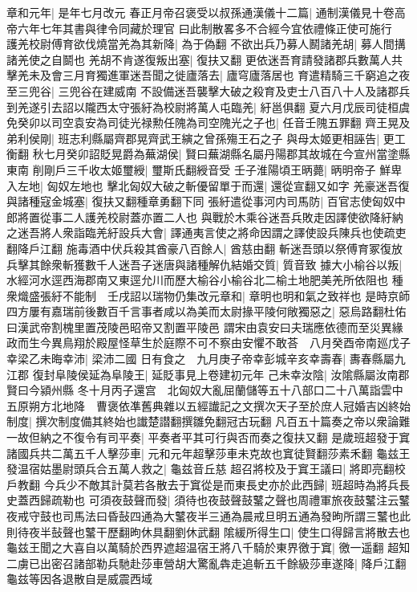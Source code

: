 章和元年|{
	是年七月改元}
春正月帝召褒受以叔孫通漢儀十二篇|{
	通制漢儀見十卷高帝六年七年其書與律令同藏於理官}
曰此制散畧多不合經今宜依禮條正使可施行　護羌校尉傅育欲伐燒當羌為其新降|{
	為于偽翻}
不欲出兵乃募人鬭諸羌胡|{
	募人間搆諸羌使之自鬬也}
羌胡不肯遂復叛出塞|{
	復扶又翻}
更依迷吾育請發諸郡兵數萬人共擊羌未及會三月育獨進軍迷吾聞之徙廬落去|{
	廬穹廬落居也}
育遣精騎三千窮追之夜至三兜谷|{
	三兜谷在建威南}
不設備迷吾襲擊大破之殺育及吏士八百八十人及諸郡兵到羌遂引去詔以隴西太守張紆為校尉將萬人屯臨羌|{
	紆邕俱翻}
夏六月戊辰司徒桓虞免癸卯以司空袁安為司徒光禄勲任隗為司空隗光之子也|{
	任音壬隗五罪翻}
齊王晃及弟利侯剛|{
	班志利縣屬齊郡晃齊武王縯之曾孫殤王石之子}
與母太姬更相誣告|{
	更工衡翻}
秋七月癸卯詔貶晃爵為蕪湖侯|{
	賢曰蕪湖縣名屬丹陽郡其故城在今宣州當塗縣東南}
削剛戶三千收太姬璽綬|{
	璽斯氏翻綬音受}
壬子淮陽頃王昞薨|{
	昞明帝子}
鮮卑入左地|{
	匈奴左地也}
擊北匈奴大破之斬優留單于而還|{
	還從宣翻又如字}
羌豪迷吾復與諸種寇金城塞|{
	復扶又翻種章勇翻下同}
張紆遣從事河内司馬防|{
	百官志使匈奴中郎將置從事二人護羌校尉蓋亦置二人也}
與戰於木乘谷迷吾兵敗走因譯使欲降紆納之迷吾將人衆詣臨羌紆設兵大會|{
	譯通夷言使之將命因謂之譯使設兵陳兵也使疏吏翻降戶江翻}
施毒酒中伏兵殺其酋豪八百餘人|{
	酋慈由翻}
斬迷吾頭以祭傅育冢復放兵擊其餘衆斬獲數千人迷吾子迷唐與諸種解仇結婚交質|{
	質音致}
據大小榆谷以叛|{
	水經河水逕西海郡南又東逕允川而歷大榆谷小榆谷北二榆土地肥美羌所依阻也}
種衆熾盛張紆不能制　壬戌詔以瑞物仍集改元章和|{
	章明也明和氣之致祥也}
是時京師四方屢有嘉瑞前後數百千言事者咸以為美而太尉掾平陵何敞獨惡之|{
	惡烏路翻杜佑曰漢武帝割槐里置茂陵邑昭帝又割置平陵邑}
謂宋由袁安曰夫瑞應依德而至災異緣政而生今異鳥翔於殿屋怪草生於庭際不可不察由安懼不敢荅　八月癸酉帝南廵戊子幸梁乙未晦幸沛|{
	梁沛二國}
日有食之　九月庚子帝幸彭城辛亥幸壽春|{
	夀春縣屬九江郡}
復封阜陵侯延為阜陵王|{
	延貶事見上卷建初元年}
己未幸汝陰|{
	汝隂縣屬汝南郡賢曰今潁州縣}
冬十月丙子還宫　北匈奴大亂屈蘭儲等五十八部口二十八萬詣雲中五原朔方北地降　曹褒依凖舊典雜以五經䜟記之文撰次天子至於庶人冠婚吉凶終始制度|{
	撰次制度備其終始也䜟楚譛翻撰雛免翻冠古玩翻}
凡百五十篇奏之帝以衆論難一故但納之不復令有司平奏|{
	平奏者平其可行與否而奏之復扶又翻}
是歲班超發于窴諸國兵共二萬五千人擊莎車|{
	元和元年超擊莎車未克故也窴徒賢翻莎素禾翻}
龜兹王發温宿姑墨尉頭兵合五萬人救之|{
	龜兹音丘慈}
超召將校及于窴王議曰|{
	將即亮翻校戶教翻}
今兵少不敵其計莫若各散去于窴從是而東長史亦於此西歸|{
	班超時為將兵長史蓋西歸疏勒也}
可須夜鼓聲而發|{
	須待也夜鼓聲鼓鼜之聲也周禮軍旅夜鼓鼜注云鼜夜戒守鼓也司馬法曰昏鼔四通為大鼜夜半三通為晨戒旦明五通為發昫所謂三鼜也此則待夜半鼔聲也鼜干歷翻昫休具翻劉休武翻}
隂緩所得生口|{
	使生口得歸言將散去也}
龜兹王聞之大喜自以萬騎於西界遮超温宿王將八千騎於東界徼于窴|{
	徼一遥翻}
超知二虜已出密召諸部勒兵馳赴莎車營胡大驚亂犇走追斬五千餘級莎車遂降|{
	降戶江翻}
龜兹等因各退散自是威震西域

